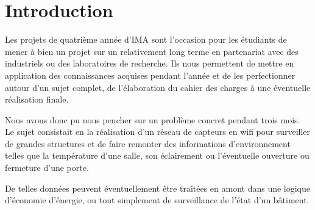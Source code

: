 	\section*{Introduction}
		Les projets de quatrième année d'IMA sont l'occasion pour les étudiants
		de mener à bien un projet sur un relativement long terme en partenariat
		avec des industriels ou des laboratoires de recherche. Ils nous permettent
		de mettre en application des connaissances acquises pendant l'année
		et de les perfectionner autour d'un sujet complet, de l'élaboration
		du cahier des charges à une éventuelle réalisation finale.
		\par
		Nous avons donc pu nous pencher sur un problème concret pendant trois
		mois. Le sujet consistait en la réalisation d'un réseau de capteurs
		en wifi pour surveiller de grandes structures et de faire remonter
		des informations d'environnement telles que la température d'une salle,
		son éclairement ou l'éventuelle ouverture ou fermeture d'une porte.
		\par
		De telles données peuvent éventuellement être traitées en amont dans une
		logique d'économie d'énergie, ou tout simplement de surveillance de
		l'état d'un bâtiment.
		
